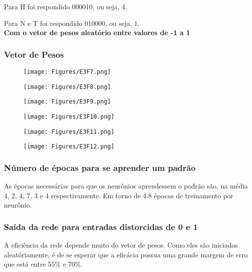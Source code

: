 \documentclass[hidelinks,12pt]{article}
\begin{document}
			Para H foi respondido 000010, ou seja, 4.
			
			Para N e T foi respondido 010000, ou seja, 1.\\
		
		\textbf{\large Com o vetor de pesos aleatório entre valores de -1 a 1}
		
		\subsubsection{Vetor de Pesos}
		
			\begin{figure}[!h]
				\centering
				\texttt{[image: Figures/E3F7.png]}
			\end{figure}
			\begin{figure}[!h]
				\centering
				\texttt{[image: Figures/E3F8.png]}
			\end{figure}
			\begin{figure}[!h]
				\centering
				\texttt{[image: Figures/E3F9.png]}
			\end{figure}
			\begin{figure}[!h]
				\centering
				\texttt{[image: Figures/E3F10.png]}
			\end{figure}
			\begin{figure}[!h]
				\centering
				\texttt{[image: Figures/E3F11.png]}
			\end{figure}
			\begin{figure}[!h]
				\centering
				\texttt{[image: Figures/E3F12.png]}
			\end{figure}
			
		\newpage
		\subsubsection{Número de épocas para se aprender um padrão}
			
			As épocas necessárias para que os neurônios aprendessem o padrão são, na média 4, 2, 4, 7, 3 e 4 respectivamente. Em torno de 4.8 épocas de treinamento por neurônio.
			
		\subsubsection{Saída da rede para entradas distorcidas de 0 e 1}
		
			A eficiência da rede depende muito do vetor de pesos. Como eles são iniciados aleatóriamente, é de se esperar que a eficácia possua uma grande margem de erro que está entre 55\% e 70\%.
		
\end{document}
